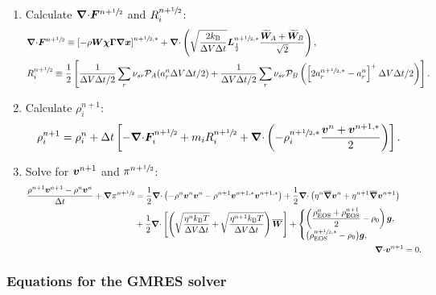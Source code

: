 \documentclass[
10pt
showpacs, showkeys,
amsmath,amssymb,
aps,
pre,
floatfix,
]{revtex4-1}
\newcommand{\divg}{{\V\nabla\cdot}}                       %
\begin{document}
\begin{enumerate}
\item Calculate $\divg\V{F}^{n+\myhalf}$ and $R^{n+\sfrac{1}{2}}_i$:
\begin{align}
&\divg\V{F}^{n+\myhalf} \equiv \left[-\rho\V{W}\V{\chi}\V{\Gamma}\grad\V{x}\right]^{n+\myhalf,*} +
\divg\left( \sqrt{ \frac{2k_\mathrm{B}}{\D{V}\D{t}} } \V{L}^{n+\myhalf,*}_{\frac12} \frac{\widetilde{\V{W}}_A+\widetilde{\V{W}}_B}{\sqrt{2}} \right),
\\
&R^{n+\myhalf}_i \equiv \frac{1}{2}\left[ \frac{1}{\D{V}\D{t}/2} \sum_r \nu_{sr} \mathcal{P}_A(a^n_r\D{V}\D{t}/2) + \frac{1}{\D{V}\D{t}/2} \sum_r \nu_{sr} \mathcal{P}_B\left( \left[ 2 a^{n+\myhalf,*}_r - a^n_r \right]^+ \D{V}\D{t}/2 \right) \right].
\end{align}

\item Calculate $\rho^{n+1}_i$:
\begin{equation}
\rho^{n+1}_i = \rho^n_i + \D{t} \left[ -\divg\V{F}^{n+\myhalf}_i + m_i R^{n+\myhalf}_i 
+ \divg\left( -\rho^{n+\myhalf,*}_i \frac{\V{v}^n + \V{v}^{n+1,*}}{2} \right) \right].
\end{equation} 

\item Solve for $\boldsymbol{v}^{n+1}$ and $\pi^{n+\sfrac{1}{2}}$:
\begin{align}
\label{boussinesq_stokes_v_2nd}
\begin{split}
\frac{\rho^{n+1}\V{v}^{n+1}-\rho^n\V{v}^n}{\D{t}} + \grad\pi^{n+\myhalf}
&= \frac{1}{2}\divg\left(-\rho^n\V{v}^n\V{v}^n-\rho^{n+1}\V{v}^{n+1,*}\V{v}^{n+1,*}\right) 
+ \frac{1}{2}\divg\left( \eta^n \overline{\grad}\V{v}^n + \eta^{n+1} \overline{\grad}\V{v}^{n+1} \right) \\
&+ \frac{1}{2}\divg\left[\left( \sqrt{\frac{\eta^n k_\mathrm{B}T}{\D{V}\D{t}}} + \sqrt{\frac{\eta^{n+1} k_\mathrm{B}T}{\D{V}\D{t}}} \right) \overline{\V{W}} \right]
+ 
\begin{cases}
\displaystyle \left(\frac{\rho^n_\mathrm{EOS}+\rho^{n+1}_\mathrm{EOS}}{2}-\rho_0\right)\V{g}, \\
\big(\rho^{n+\myhalf,*}_\mathrm{EOS}-\rho_0\big)\V{g}, 
\end{cases}
\end{split} \\
\label{boussinesq_stokes_p_2nd}
\divg\V{v}^{n+1} & = 0.
\end{align}

\end{enumerate}



\subsubsection*{Equations for the GMRES solver}
\end{document}

